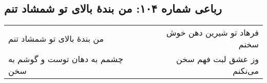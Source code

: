 \begin{center}
\section*{رباعی شماره ۱۰۴: من بندهٔ بالای تو شمشاد تنم}
\label{sec:104}
\begin{longtable}{l p{0.5cm} r}
من بندهٔ بالای تو شمشاد تنم
&&
فرهاد تو شیرین دهن خوش سخنم
\\
چشمم به دهان توست و گوشم به سخن
&&
وز عشق لبت فهم سخن می‌نکنم
\\
\end{longtable}
\end{center}
